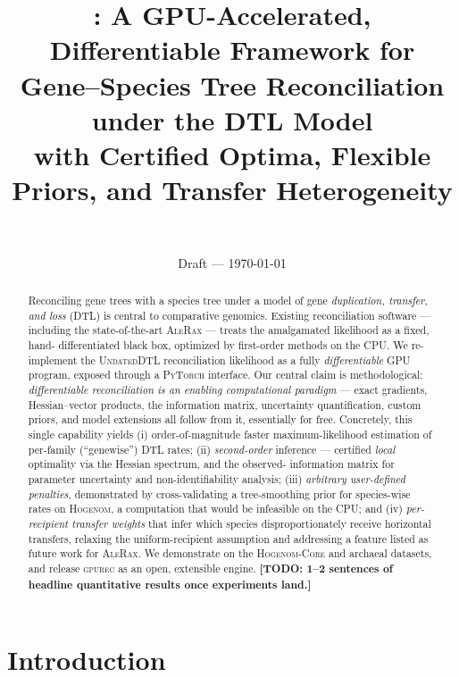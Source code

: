 \documentclass[11pt]{article}
\title{\textbf{\toolname: A GPU-Accelerated, Differentiable Framework for\\
Gene--Species Tree Reconciliation under the DTL Model\\
\large with Certified Optima, Flexible Priors, and Transfer Heterogeneity}}
\author{%
  \TODO{author list} \\[2pt]
  \small \TODO{affiliations}
}
\date{Draft --- \today}
\newcommand{\toolname}{\textsc{gpurec}\xspace}
\newcommand{\TODO}[1]{{\color{red!70!black}\textbf{[TODO: #1]}}}
\begin{document}
\maketitle

\begin{abstract}
\noindent
Reconciling gene trees with a species tree under a model of gene
\emph{duplication, transfer, and loss} (DTL) is central to comparative
genomics. Existing reconciliation software --- including the state-of-the-art
\textsc{AleRax} --- treats the amalgamated likelihood as a fixed, hand-%
differentiated black box, optimized by first-order methods on the CPU. We
re-implement the \textsc{UndatedDTL} reconciliation likelihood as a fully
\emph{differentiable} GPU program, exposed through a \textsc{PyTorch} interface.
Our central claim is methodological: \emph{differentiable reconciliation is an
enabling computational paradigm} --- exact gradients, Hessian--vector products,
the information matrix, uncertainty quantification, custom priors, and model
extensions all follow from it, essentially for free. Concretely, this single
capability yields (i) order-of-magnitude faster maximum-likelihood estimation of
per-family (``genewise'') DTL rates; (ii) \emph{second-order} inference ---
certified \emph{local} optimality via the Hessian spectrum, and the observed-%
information matrix for parameter uncertainty and non-identifiability analysis;
(iii) \emph{arbitrary user-defined penalties}, demonstrated by cross-validating a
tree-smoothing prior for species-wise rates on \textsc{Hogenom}, a computation
that would be infeasible on the CPU; and (iv) \emph{per-recipient transfer
weights} that infer which species disproportionately receive horizontal
transfers, relaxing the uniform-recipient assumption and addressing a feature
listed as future work for \textsc{AleRax}. We demonstrate on the
\textsc{Hogenom-Core} and archaeal datasets, and release \toolname as an open,
extensible engine. \TODO{1--2 sentences of headline quantitative results once
experiments land.}
\end{abstract}

\section{Introduction}
\label{sec:intro}
\end{document}
